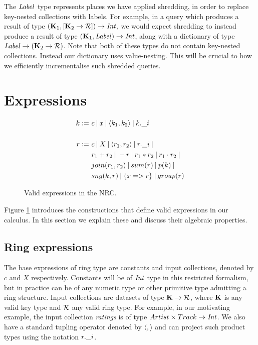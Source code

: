 {{{The $\textrm{\textit{Label}}$ type represents places we have applied shredding, in order to replace key-nested collections with labels. For example, in a query which produces a result of type  $(\mathbf{K}_1,[\mathbf{K}_2 \rightarrow \mathcal{R}]) \rightarrow \textrm{\textit{Int}}$, we would expect shredding to instead produce a result of type 
$(\mathbf{K}_1,\textrm{\textit{Label}}) \rightarrow \textrm{\textit{Int}}$, along with a dictionary of type $\textrm{\textit{Label}} \rightarrow (\mathbf{K}_2 \rightarrow \mathcal{R})$. Note that both of these types do not contain key-nested collections. Instead our dictionary uses value-nesting. This will be crucial to how we efficiently incrementalise such shredded queries.

}

\section{Expressions}

\begin{figure}
\begin{equation*}
\begin{split}
k := \ & c \: | \: x \: | \: \langle k_1, k_2 \rangle \: | \: k.\_i \\ \\
r := \ & c \: | \: X \: | \: \langle r_1, r_2 \rangle \: | \: r.\_i \: | \: \\
& r_1 + r_2 \: | \: -r \: | \: r_1 \ast r_2 \: | \: r_1 \cdot r_2 \: | \: \\
& join(r_1,r_2) \: | \: sum(r) \: | \: p(k) \: | \: \\
& sng(k,r) \: | \: \{ x => r \} \: | \: group(r)
\end{split}
\end{equation*}
\caption{Valid expressions in the NRC.}
\label{nrcexprs}
\end{figure}

Figure \ref{nrcexprs} introduces the constructions that define valid expressions in our calculus. In this section we explain these and discuss their algebraic properties.

\subsection{Ring expressions} {
The base expressions of ring type are constants and input collections, denoted by $c$ and $X$ respectively. Constants will be of $\textrm{\textit{Int}}$ type in this restricted formalism, but in practice can be of any numeric type or other primitive type admitting a ring structure. Input collections are datasets of type $\mathbf{K} \rightarrow \mathcal{R}$, where $\mathbf{K}$ is any valid key type and $\mathcal{R}$ any valid ring type. For example, in our motivating example, the input collection \textit{ratings} is of type $Artist \times Track \rightarrow \textrm{\textit{Int}}$. We also have a standard tupling operator denoted by $\langle , \rangle$ and can project such product types using the notation $r.\_i$.

}}}
